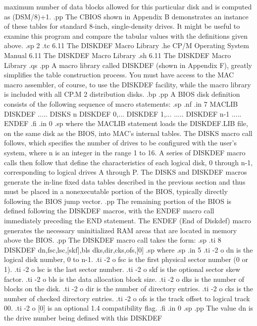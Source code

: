 maximum number of data blocks allowed for this particular disk 
and is computed as (DSM/8)+1.
.pp
The CBIOS shown in Appendix B demonstrates an instance of these 
tables for standard 8-inch, single-density drives.  It might be 
useful to examine this program and compare the tabular values 
with the definitions given above.
.sp 2
.tc    6.11  The DISKDEF Macro Library
.he CP/M Operating System Manual      6.11  The DISKDEF Macro Library
.sh
6.11  The DISKDEF Macro Library
.qs
.pp
A macro library called DISKDEF (shown in Appendix F), greatly 
simplifies the table construction process.  You must have access 
to the MAC macro assembler, of course, to use the DISKDEF 
facility, while the macro library is included with all CP.M 2 
distribution disks.
.bp
.pp
A BIOS disk definition consists of the following sequence of 
macro statements:
.sp
.nf
.in 7
 MACLIB         DISKDEF
 .....
 DISKS          n
 DISKDEF        0,...
 DISKDEF        1,...
 .....
 DISKDEF        n-1
 .....
 ENDEF
.fi
.in 0
.sp
where the MACLIB statement loads the DISKDEF.LIB file, on the 
same disk as the BIOS, into MAC's internal tables.  The DISKS 
macro call follows, which specifies the number of drives to be 
configured  with the user's system, where n is an integer in the 
range 1 to 16.  A series of DISKDEF macro calls then follow that 
define the characteristics of each logical disk, 0 through n-1, 
corresponding to logical drives A through P.  The DISKS and 
DISKDEF macros generate the in-line fixed data tables described 
in the previous section and thus must be placed in a 
nonexecutable portion of the BIOS, typically directly following 
the BIOS jump vector.
.pp
The remaining portion of the BIOS is defined following the 
DISKDEF macros, with the ENDEF macro call immediately preceding 
the END statement.  The ENDEF (End of Diskdef) macro generates 
the necessary uninitialized RAM areas that are located in 
memory above the BIOS.
.pp
The DISKDEF macro call takes the form:
.sp
.ti 8
DISKDEF  dn,fsc,lsc,[skf],bls dks,dir,cks,ofs,[0]
.sp
where
.sp
.in 5
.ti -2
o dn is the logical disk number, 0 to n-1.
.ti -2
o fsc is the first physical sector number (0 or 1).
.ti -2
o lsc is the last sector number.
.ti -2
o skf is the optional sector skew factor.
.ti -2
o bls is the data allocation block size.
.ti -2
o dks is the number of blocks on the disk.
.ti -2
o dir is the number of directory entries.
.ti -2
o cks is the number of checked directory entries.
.ti -2
o ofs is the track offset to logical track 00.
.ti -2
o [0] is an optional 1.4 compatibility flag.
.fi
.in 0
.sp
.pp
The value dn is the drive number being defined with this DISKDEF 
